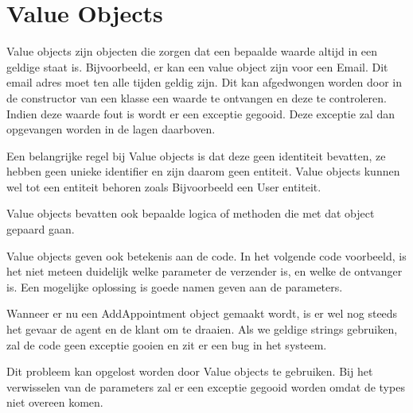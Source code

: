 
\section{Value Objects}
\label{sec:value-objects}

Value objects zijn objecten die zorgen dat een bepaalde waarde altijd in een geldige staat is. Bijvoorbeeld, er kan een value object zijn voor een Email. Dit email adres moet ten alle tijden geldig zijn. Dit kan afgedwongen worden door in de constructor van een klasse een waarde te ontvangen en deze te controleren. Indien deze waarde fout is wordt er een exceptie gegooid. Deze exceptie zal dan opgevangen worden in de lagen daarboven.

Een belangrijke regel bij Value objects is dat deze geen identiteit bevatten, ze hebben geen unieke identifier en zijn daarom geen entiteit. Value objects kunnen wel tot een entiteit behoren zoals Bijvoorbeeld een User entiteit.

Value objects bevatten ook bepaalde logica of methoden die met dat object gepaard gaan.

Value objects geven ook betekenis aan de code. In het volgende code voorbeeld, is het niet meteen duidelijk welke parameter de verzender is, en welke de ontvanger is. Een mogelijke oplossing is goede namen geven aan de parameters.


Wanneer er nu een AddAppointment object gemaakt wordt, is er wel nog steeds het gevaar de agent en de klant om te draaien. Als we geldige strings gebruiken, zal de code geen exceptie gooien en zit er een bug in het systeem.

Dit probleem kan opgelost worden door Value objects te gebruiken. Bij het verwisselen van de parameters zal er een exceptie gegooid worden omdat de types niet overeen komen.

